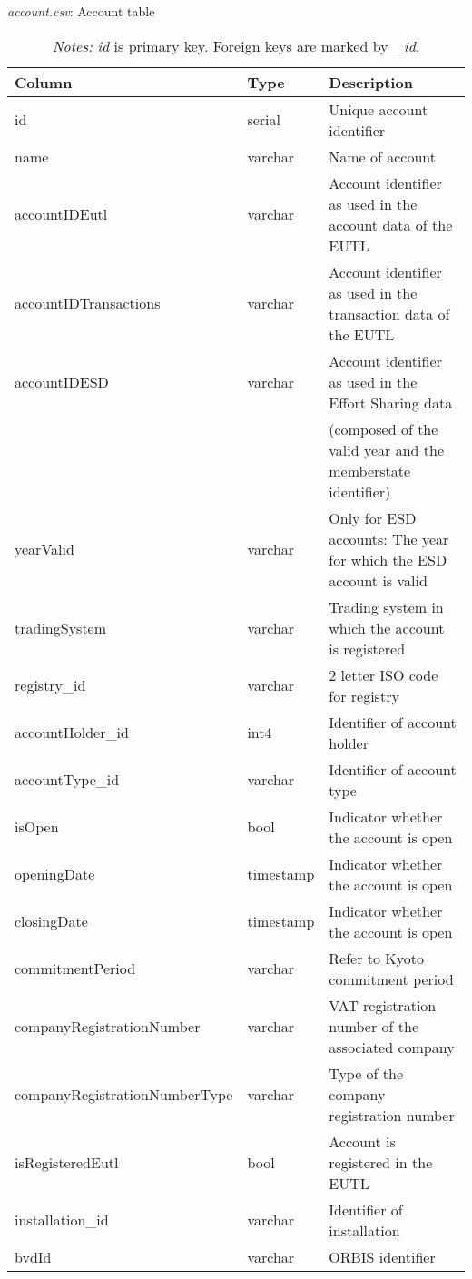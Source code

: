 \documentclass[authoryear]{elsarticle}
\begin{document}
\begin{table}[htbp]\scriptsize
	\caption{\textit{account.csv}: Account table}\label{tab:tbl_account}
	\centering
	\begin{tabular*}{\textwidth}{@{}@{\extracolsep{\fill}} lll @{}}
		\toprule
		\toprule
		\textbf{Column } & \textbf{Type} & \textbf{Description}\\
		\midrule
		id    & serial & Unique account identifier \\
		name  & varchar & Name of account \\
		accountIDEutl& varchar & Account identifier as used in the account data of the EUTL \\
		accountIDTransactions& varchar & Account identifier as used in the transaction data of the EUTL \\
		accountIDESD& varchar & Account identifier as used in the Effort Sharing data  \\
		& &(composed of the valid year and the memberstate identifier)\\
		yearValid& varchar & Only for ESD accounts: The year for which the ESD account is valid \\
		tradingSystem & varchar & Trading system in which the account is registered\\
		registry\_id & varchar & 2 letter ISO code for registry \\
		accountHolder\_id & int4  & Identifier of account holder \\
		accountType\_id & varchar & Identifier of account type \\
		isOpen & bool  & Indicator whether the account is open  \\
		openingDate & timestamp & Indicator whether the account is open  \\
		closingDate & timestamp & Indicator whether the account is open  \\
		commitmentPeriod & varchar & Refer to Kyoto commitment period \\
		companyRegistrationNumber & varchar & VAT registration number of the associated company \\
		companyRegistrationNumberType & varchar & Type of the company registration number \\
		isRegisteredEutl & bool  & Account is registered in the EUTL \\
		installation\_id & varchar & Identifier of installation \\
		bvdId & varchar & ORBIS identifier \\
		\bottomrule
		\bottomrule
	\end{tabular*}%
	\vspace{-3ex}
\caption*{\footnotesize \emph{Notes:} \textit{id} is primary key. Foreign keys are marked by \textit{\_id}.}
\vspace{0ex}
\end{table}
\end{document}
